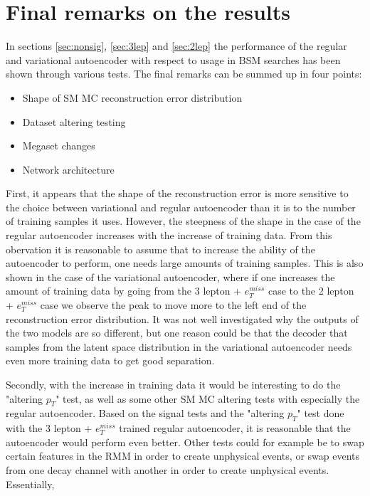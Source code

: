 \section{Final remarks on the results}
In sections \ref{sec:nonsig}, \ref{sec:3lep} and \ref{sec:2lep} the performance 
of the regular and variational autoencoder with respect to usage in BSM 
searches has been shown through various tests. The final remarks can be summed 
up in four points:
\begin{itemize}
    
    \item Shape of SM MC reconstruction error distribution 
    \item Dataset altering testing
    \item Megaset changes 
    \item Network architecture

\end{itemize}
First, it appears that the shape of the reconstruction error is more sensitive 
to the choice between variational and regular autoencoder than it is to the 
number of training samples it uses. However, the steepness of the shape in the 
case of the regular autoencoder increases with the increase of training data. 
From this obervation it is reasonable to assume that to increase the ability of 
the autoencoder to perform, one needs large amounts of training samples. This 
is also shown in the case of the variational autoencoder, where if one increases 
the amount of training data by going from the 3 lepton + $e_T^{miss}$ case to 
the 2 lepton + $e_T^{miss}$ case we observe the peak to move more to the left 
end of the reconstruction error distribution. It was not well investigated 
why the outputs of the two models are so different, but one reason could be 
that the decoder that samples from the latent space distribution in the 
variational autoencoder needs even more training data to get good separation. \par 
Secondly, with the increase in training data it would be interesting to do the 
"altering $p_T$" test, as well as some other SM MC altering tests with especially the 
regular autoencoder. Based on the signal tests and the "altering $p_T$" test done with 
the 3 lepton + $e_T^{miss}$ trained regular autoencoder, it is reasonable that the 
autoencoder would perform even better. Other tests could for example be to swap 
certain features in the RMM in order to create unphysical events, or swap events from
one decay channel with another in order to create unphysical events. Essentially, 

